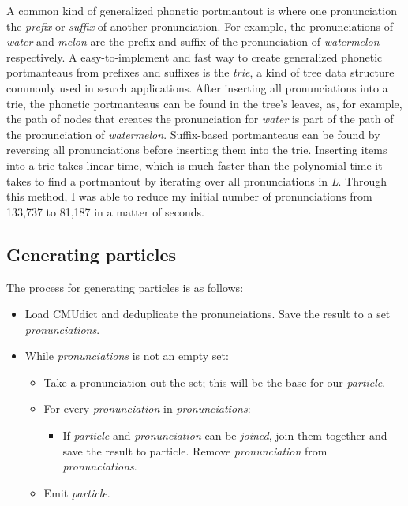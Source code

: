 \documentclass[sn-mathphys,Numbered]{sn-jnl}%
\theoremstyle{thmstyleone}%
\theoremstyle{thmstyletwo}%
\theoremstyle{thmstylethree}%
\begin{document}
A common kind of generalized phonetic portmantout is where one pronunciation the \textit{prefix} or \textit{suffix} of another pronunciation. For example, the pronunciations of \textit{water} and \textit{melon} are the prefix and suffix of the pronunciation of \textit{watermelon} respectively. A easy-to-implement and fast way to create generalized phonetic portmanteaus from prefixes and suffixes is the \textit{trie}, a kind of tree data structure commonly used in search applications. After inserting all pronunciations into a trie, the phonetic portmanteaus can be found in the tree's leaves, as, for example, the path of nodes that creates the pronunciation for \textit{water} is part of the path of the pronunciation of \textit{watermelon}.  Suffix-based portmanteaus can be found by reversing all pronunciations before inserting them into the trie. Inserting items into a trie takes linear time, which is much faster than the polynomial time it takes to find a portmantout by iterating over all pronunciations in \textit{L}. Through this method, I was able to reduce my initial number of pronunciations from 133,737 to 81,187 in a matter of seconds.

\subsection{Generating particles}\label{subsec2}

The process for generating particles is as follows:
\begin{itemize}
    \item Load CMUdict and deduplicate the pronunciations. Save the result to a set \textit{pronunciations}.
    \item While \textit{pronunciations} is not an empty set:
    \begin{itemize}
        \item Take a pronunciation out the set; this will be the base for our \textit{particle}.
        \item For every \textit{pronunciation} in \textit{pronunciations}:
        \begin{itemize}
            \item If \textit{particle} and \textit{pronunciation} can be \textit{joined}, join them together and save the result to particle. Remove \textit{pronunciation} from \textit{pronunciations}. 
        \end{itemize}
        \item Emit \textit{particle}.
    \end{itemize}
\end{itemize}
\end{document}
